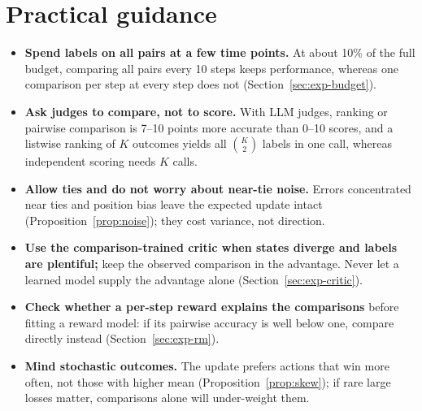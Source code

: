 \documentclass[11pt]{article}
\theoremstyle{remark}
\begin{document}
\section{Practical guidance}
\label{sec:guidance}
\begin{itemize}
\item \textbf{Spend labels on all pairs at a few time points.} At about 10\% of the full budget, comparing all pairs every 10 steps keeps performance, whereas one comparison per step at every step does not (Section~\ref{sec:exp-budget}).
\item \textbf{Ask judges to compare, not to score.} With LLM judges, ranking or pairwise comparison is 7--10 points more accurate than 0--10 scores, and a listwise ranking of $K$ outcomes yields all $\binom{K}{2}$ labels in one call, whereas independent scoring needs $K$ calls.
\item \textbf{Allow ties and do not worry about near-tie noise.} Errors concentrated near ties and position bias leave the expected update intact (Proposition~\ref{prop:noise}); they cost variance, not direction.
\item \textbf{Use the comparison-trained critic when states diverge and labels are plentiful;} keep the observed comparison in the advantage. Never let a learned model supply the advantage alone (Section~\ref{sec:exp-critic}).
\item \textbf{Check whether a per-step reward explains the comparisons} before fitting a reward model: if its pairwise accuracy is well below one, compare directly instead (Section~\ref{sec:exp-rm}).
\item \textbf{Mind stochastic outcomes.} The update prefers actions that win more often, not those with higher mean (Proposition~\ref{prop:skew}); if rare large losses matter, comparisons alone will under-weight them.
\end{itemize}

\end{document}
